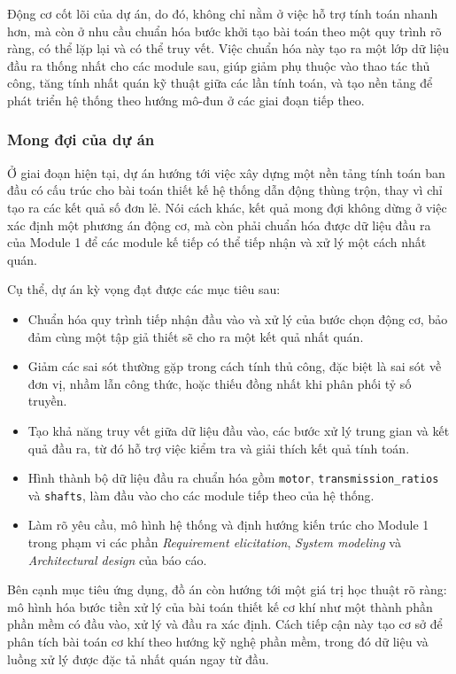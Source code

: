\documentclass[a4paper]{article}
\begin{document}
Động cơ cốt lõi của dự án, do đó, không chỉ nằm ở việc hỗ trợ tính toán nhanh hơn, mà còn ở nhu cầu chuẩn hóa bước khởi tạo bài toán theo một quy trình rõ ràng, có thể lặp lại và có thể truy vết. Việc chuẩn hóa này tạo ra một lớp dữ liệu đầu ra thống nhất cho các module sau, giúp giảm phụ thuộc vào thao tác thủ công, tăng tính nhất quán kỹ thuật giữa các lần tính toán, và tạo nền tảng để phát triển hệ thống theo hướng mô-đun ở các giai đoạn tiếp theo.

\subsubsection{Mong đợi của dự án}

Ở giai đoạn hiện tại, dự án hướng tới việc xây dựng một nền tảng tính toán ban đầu có cấu trúc cho bài toán thiết kế hệ thống dẫn động thùng trộn, thay vì chỉ tạo ra các kết quả số đơn lẻ. Nói cách khác, kết quả mong đợi không dừng ở việc xác định một phương án động cơ, mà còn phải chuẩn hóa được dữ liệu đầu ra của Module 1 để các module kế tiếp có thể tiếp nhận và xử lý một cách nhất quán.

Cụ thể, dự án kỳ vọng đạt được các mục tiêu sau:

\begin{itemize}
\item Chuẩn hóa quy trình tiếp nhận đầu vào và xử lý của bước chọn động cơ, bảo đảm cùng một tập giả thiết sẽ cho ra một kết quả nhất quán.
\item Giảm các sai sót thường gặp trong cách tính thủ công, đặc biệt là sai sót về đơn vị, nhầm lẫn công thức, hoặc thiếu đồng nhất khi phân phối tỷ số truyền.
\item Tạo khả năng truy vết giữa dữ liệu đầu vào, các bước xử lý trung gian và kết quả đầu ra, từ đó hỗ trợ việc kiểm tra và giải thích kết quả tính toán.
\item Hình thành bộ dữ liệu đầu ra chuẩn hóa gồm \texttt{motor}, \texttt{transmission\_ratios} và \texttt{shafts}, làm đầu vào cho các module tiếp theo của hệ thống.
\item Làm rõ yêu cầu, mô hình hệ thống và định hướng kiến trúc cho Module 1 trong phạm vi các phần \textit{Requirement elicitation}, \textit{System modeling} và \textit{Architectural design} của báo cáo.
\end{itemize}

Bên cạnh mục tiêu ứng dụng, đồ án còn hướng tới một giá trị học thuật rõ ràng: mô hình hóa bước tiền xử lý của bài toán thiết kế cơ khí như một thành phần phần mềm có đầu vào, xử lý và đầu ra xác định. Cách tiếp cận này tạo cơ sở để phân tích bài toán cơ khí theo hướng kỹ nghệ phần mềm, trong đó dữ liệu và luồng xử lý được đặc tả nhất quán ngay từ đầu.
\end{document}
